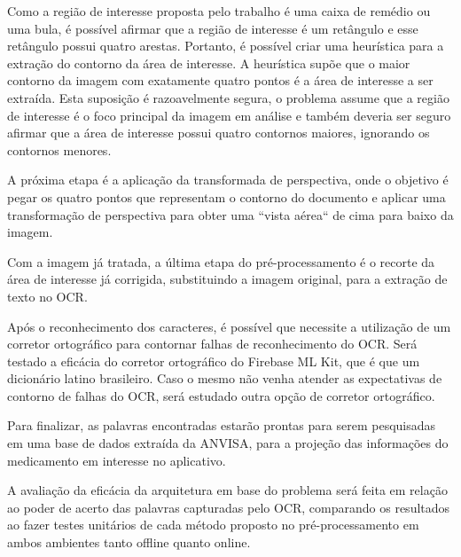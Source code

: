 Como a região de interesse proposta pelo trabalho é uma caixa de remédio ou uma bula, é possível afirmar que a região de interesse é um retângulo e esse retângulo possui quatro arestas. Portanto, é possível criar uma heurística para a extração do contorno da área de interesse. A heurística supõe que o maior contorno da imagem com exatamente quatro pontos é a área de interesse a ser extraída. Esta suposição é razoavelmente segura, o problema assume que a região de interesse é o foco principal da imagem em análise e também deveria ser seguro afirmar que a área de interesse possui quatro contornos maiores, ignorando os contornos menores.

A próxima etapa é a aplicação da transformada de perspectiva, onde o objetivo é pegar os quatro pontos que representam o contorno do documento e aplicar uma transformação de perspectiva para obter uma ``vista aérea`` de cima para baixo da imagem.

Com a imagem já tratada, a última etapa do pré-processamento é o recorte da área de interesse já corrigida, substituindo a imagem original, para a extração de texto no OCR.

Após o reconhecimento dos caracteres, é possível que necessite a utilização de um corretor ortográfico para contornar falhas de reconhecimento do OCR. Será testado a eficácia do corretor ortográfico do Firebase ML Kit, que é que um dicionário latino brasileiro. Caso o mesmo não venha atender as expectativas de contorno de falhas do OCR, será estudado outra opção de corretor ortográfico.

Para finalizar, as palavras encontradas estarão prontas para serem pesquisadas em uma base de dados extraída da ANVISA, para a projeção das informações do medicamento em interesse no aplicativo. 

A avaliação da eficácia da arquitetura em base do problema será feita em relação ao poder de acerto das palavras capturadas pelo OCR, comparando os resultados ao fazer testes unitários de cada método proposto no pré-processamento em ambos ambientes tanto offline quanto online.




